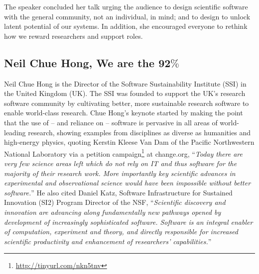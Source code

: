 \documentclass[11pt, oneside]{amsart}
\begin{document}
The speaker concluded her talk urging the audience to design scientific software
with the general community, not an individual, in mind; and to design to unlock
latent potential of our systems. In addition, she encouraged everyone to rethink
how we reward researchers and support roles.


\subsection{Neil Chue Hong, We are the 92$\%$~\cite{Hong_slides}}
\label{keynote2}
\begin{comment}
In a recent survey of UK research-intensive universities, 92\% of researchers
said they used research software and 68\% said their research would be impossible
without software. Yet 71\% have had no formal software training, and few are
ready to apply many of the things we take for granted such as testing or
virtualization. WSSSPE represents the pinnacle of what we understand to be the
best practice around scientific software in our community. My talk will
challenge the workshop participants to come up with ways of taking this best
practice to those 92\% of researchers in a way that will lead to maximum benefit
to the scientific community.
 \end{comment}


Neil Chue Hong is the Director of the Software Sustainability Institute (SSI) in the
United Kingdom (UK). The SSI was founded to support the UK's research software
community by cultivating better, more sustainable research software to enable
world-class research. Chue Hong's keynote started by making the point
that the use of -- and reliance on -- software is pervasive in all areas of
world-leading research, showing examples from disciplines as diverse as
humanities and high-energy physics, quoting Kerstin Kleese Van Dam of the
Pacific Northwestern National Laboratory via a petition
campaign\footnote{\url{http://tinyurl.com/nkn5tnv}}
at change.org, ``\emph{Today there are very few science areas left which do not
rely on IT and thus software for the majority of their research work. More
importantly key scientific advances in experimental and observational science
would have been impossible without better software.}'' He also cited Daniel
Katz, Software Infrastructure for Sustained Innovation (SI2) Program Director of
the NSF, ``\emph{Scientific discovery and innovation are advancing along
fundamentally new pathways opened by development of increasingly sophisticated
software. Software is an integral enabler of computation, experiment and theory,
and directly responsible for increased scientific productivity and enhancement
of researchers' capabilities.}''
\end{document}
